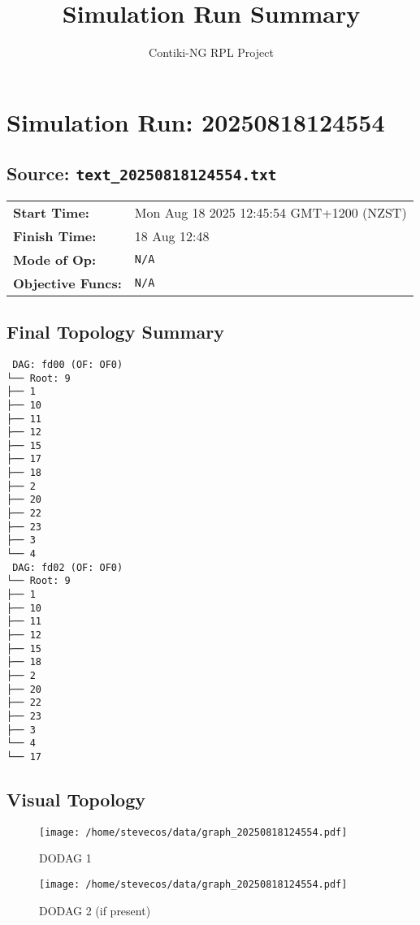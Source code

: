 \documentclass[a4paper]{article}
\begin{document}
\title{Simulation Run Summary}
\author{Contiki-NG RPL Project}
\maketitle


\section*{Simulation Run: 20250818124554}
\subsection*{Source: \texttt{text\_20250818124554.txt}}

\begin{tabular}{@{}ll}
\textbf{Start Time:} & Mon Aug 18 2025 12:45:54 GMT+1200 (NZST) \\
\textbf{Finish Time:} & 18 Aug 12:48 \\
\textbf{Mode of Op:} & \texttt{N/A} \\
\textbf{Objective Funcs:} & \texttt{N/A} \\
\end{tabular}

\subsection*{Final Topology Summary}
\begin{lstlisting}
 DAG: fd00 (OF: OF0)
└── Root: 9
├── 1
├── 10
├── 11
├── 12
├── 15
├── 17
├── 18
├── 2
├── 20
├── 22
├── 23
├── 3
└── 4
 DAG: fd02 (OF: OF0)
└── Root: 9
├── 1
├── 10
├── 11
├── 12
├── 15
├── 18
├── 2
├── 20
├── 22
├── 23
├── 3
└── 4
└── 17
\end{lstlisting}

\subsection*{Visual Topology}
\begin{figure}[h!]
    \centering
    \begin{minipage}{0.48\textwidth}
        \centering
        \texttt{[image: /home/stevecos/data/graph\_20250818124554.pdf]}
        \caption*{DODAG 1}
    \end{minipage}
    \hfill
    \begin{minipage}{0.48\textwidth}
        \centering
        \texttt{[image: /home/stevecos/data/graph\_20250818124554.pdf]}
        \caption*{DODAG 2 (if present)}
    \end{minipage}
\end{figure}
\end{document}
